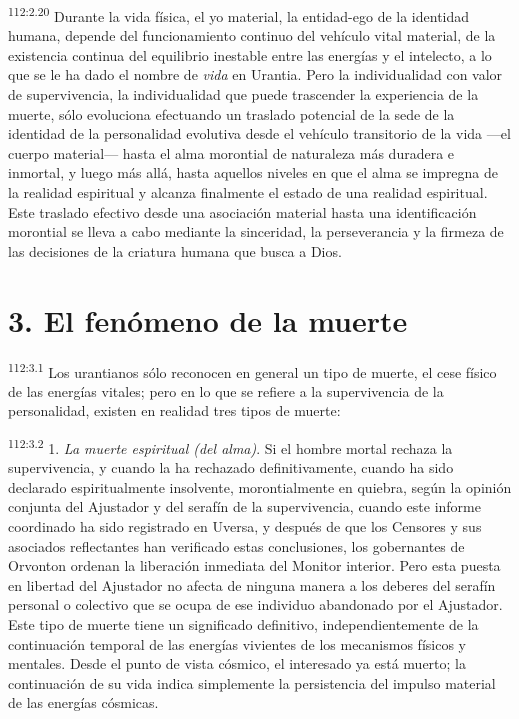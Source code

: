 \documentclass[twoside, 11pt]{book}
\begin{document}
\par
\textsuperscript{112:2.20} Durante la vida física, el yo material, la entidad-ego de la identidad humana, depende del funcionamiento continuo del vehículo vital material, de la existencia continua del equilibrio inestable entre las energías y el intelecto, a lo que se le ha dado el nombre de \textit{vida} en Urantia. Pero la individualidad con valor de supervivencia, la individualidad que puede trascender la experiencia de la muerte, sólo evoluciona efectuando un traslado potencial de la sede de la identidad de la personalidad evolutiva desde el vehículo transitorio de la vida ---el cuerpo material--- hasta el alma morontial de naturaleza más duradera e inmortal, y luego más allá, hasta aquellos niveles en que el alma se impregna de la realidad espiritual y alcanza finalmente el estado de una realidad espiritual. Este traslado efectivo desde una asociación material hasta una identificación morontial se lleva a cabo mediante la sinceridad, la perseverancia y la firmeza de las decisiones de la criatura humana que busca a Dios.

\section*{3. El fenómeno de la muerte}
\par
\textsuperscript{112:3.1} Los urantianos sólo reconocen en general un tipo de muerte, el cese físico de las energías vitales; pero en lo que se refiere a la supervivencia de la personalidad, existen en realidad tres tipos de muerte:

\par
\textsuperscript{112:3.2} 1. \textit{La muerte espiritual (del alma)}. Si el hombre mortal rechaza la supervivencia, y cuando la ha rechazado definitivamente, cuando ha sido declarado espiritualmente insolvente, morontialmente en quiebra, según la opinión conjunta del Ajustador y del serafín de la supervivencia, cuando este informe coordinado ha sido registrado en Uversa, y después de que los Censores y sus asociados reflectantes han verificado estas conclusiones, los gobernantes de Orvonton ordenan la liberación inmediata del Monitor interior. Pero esta puesta en libertad del Ajustador no afecta de ninguna manera a los deberes del serafín personal o colectivo que se ocupa de ese individuo abandonado por el Ajustador. Este tipo de muerte tiene un significado definitivo, independientemente de la continuación temporal de las energías vivientes de los mecanismos físicos y mentales. Desde el punto de vista cósmico, el interesado ya está muerto; la continuación de su vida indica simplemente la persistencia del impulso material de las energías cósmicas.
\end{document}
